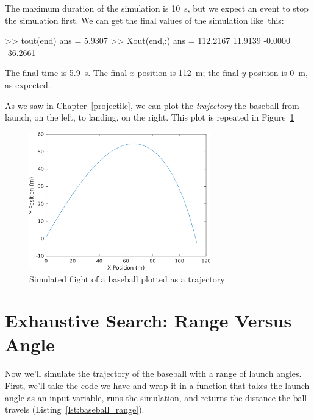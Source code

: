 
The maximum duration of the simulation is \SI{10}{\second}, but we expect an event to stop the simulation first.  We can get the final values of the simulation like~this:

\begin{code}
>> tout(end)
ans =
    5.9307
>> Xout(end,:)
ans =
  112.2167   11.9139   -0.0000  -36.2661
\end{code}

The final time is \SI{5.9}{\second}.  The final $x$-position is \SI{112}{\meter}; the final $y$-position is \SI{0}{m}, as expected.



As we saw in Chapter~\ref{projectile}, we can plot the \emph{trajectory} the baseball from launch, on the left, to landing, on the right.  This plot is repeated in Figure~\ref{f:baseball3}

\begin{figure}[h]
\centerline{\includegraphics[width=0.7\textwidth]{../code/chap12/baseball2_xy.png}}
\caption{Simulated flight of a baseball plotted as a trajectory}
\label{f:baseball3}
\end{figure}



\section{Exhaustive Search: Range Versus Angle}

Now we'll simulate the trajectory of the baseball with a range of launch angles.  First, we'll take the code we have and wrap it in a function that takes the launch angle as an input variable, runs the simulation, and returns the distance the ball travels (Listing~\ref{lst:baseball_range}).

